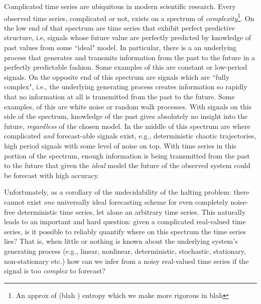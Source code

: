 Complicated time series are ubiquitous in modern scientific research. 
Every observed time series, complicated or not, exists on a spectrum of \emph{complexity}\footnote{An approx of (blah ) entropy which we make more rigorous in blah}. On the low end of that spectrum are time series that exhibit perfect predictive structure, i.e, signals whose future value are perfectly predicted by knowledge of past values from some ``ideal" model. In particular, there is a an underlying process that generates and transmits information from the past to the future in a perfectly predictable fashion. Some examples of this are constant or low-period signals. On the opposite end of this spectrum are signals which are ``fully complex", i.e., the underlying generating process creates information so rapidly that no information at all is transmitted from the past to the future. Some examples, of this are white noise or random walk processes. With signals on this side of the spectrum, knowledge of the past gives absolutely no insight into the future, \emph{regardless} of the chosen model.  In the middle of this spectrum are where complicated \emph{and} forecast-able signals exist, e.g., deterministic chaotic trajectories, high period signals with some level of noise on top. With time series in this portion of the spectrum, enough information is being transmitted from the past to the future that given the \emph{ideal} model the future of the observed system could be forecast with high accuracy. 

Unfortunately, as a corollary of the undecidability of the halting problem: there cannot exist \emph{one} universally ideal forecasting scheme for even completely noise-free deterministic time series\cite{weigend-book}, let alone an arbitrary time series. This naturally leads to an important and hard question: given a complicated real-valued time series, is it possible to reliably quantify where on this spectrum the time series lies? That is, when little or nothing is known about the underlying system's generating process (e.g., linear, nonlinear, deterministic, stochastic, stationary, non-stationary etc.) how can we infer from a noisy real-valued time series if the signal is too \emph{complex} to forecast?






